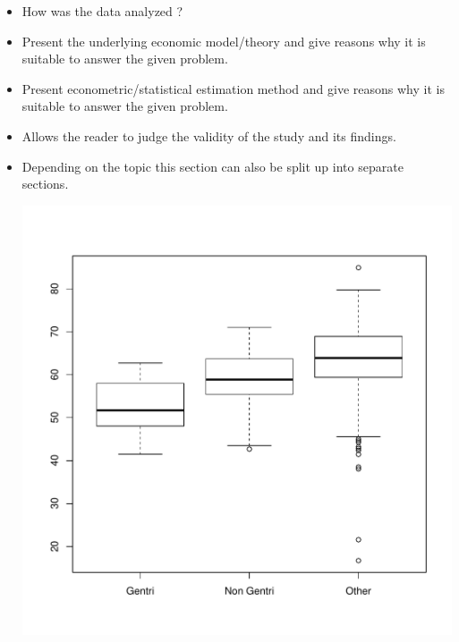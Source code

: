 \documentclass[a4paper,11pt]{article}\usepackage[]{graphicx}\usepackage[]{color}
\makeatletter
\def\maxwidth{ %
  \ifdim\Gin@nat@width>\linewidth
    \linewidth
  \else
    \Gin@nat@width
  \fi
}
\newenvironment{knitrout}{}{} %
\makeatother
\begin{document}
\begin{itemize}

    \item How was the data analyzed ?

    \item Present the underlying economic model/theory and
        give reasons why it is suitable to answer the given problem.

    \item Present econometric/statistical estimation method and
        give reasons why it is suitable to answer the given problem.

    \item Allows the reader to judge the validity of the study and
        its findings.

    \item Depending on the topic this section can also be split up
        into separate sections.

\begin{knitrout}
\color{fgcolor}
\includegraphics[width=\maxwidth]{figure/unnamed-chunk-3-1} 

\end{knitrout}


\end{itemize}
\end{document}

